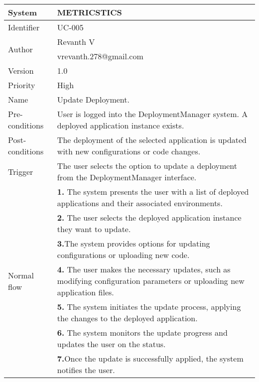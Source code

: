 \begin{table}[htb]
    \centering
    \begin{tabular}{|p{4cm}|p{12cm}|} \hline 
         System &  METRICSTICS\\ \hline 
         
         Identifier & UC-005 \\ \hline 
         
         \multirow{2}{*}{Author} & Revanth V  \\
         &vrevanth.278@gmail.com\\
           \hline 
           Version & 1.0\\ \hline
         
         Priority &  High\\ \hline 
         
         Name &  Update Deployment. \\ \hline 
         Pre-conditions & User is logged into the DeploymentManager system.
A deployed application instance exists. \\ \hline 
         Post-conditions & The deployment of the selected application is updated with new configurations or code changes. \\ \hline
         Trigger & The user selects the option to update a deployment from the DeploymentManager interface.
 \\ \hline
        \multirow{7}{*}{Normal flow} 
        & \textbf{1.}   The system presents the user with a list of deployed applications and their associated environments. \\ 
        & \textbf{2.}  The user selects the deployed application instance they want to update.\\
 & \textbf{3.}The system provides options for updating configurations or uploading new code. \\ 
        & \textbf{4.} The user makes the necessary updates, such as modifying configuration parameters or uploading new application files.\\
 & \textbf{5.}  The system initiates the update process, applying the changes to the deployed application. \\ 
        & \textbf{6.}  The system monitors the update progress and updates the user on the status.\\
 & \textbf{7.}Once the update is successfully applied, the system notifies the user. \\ 
         
         
        

\end{tabular}
\end{table}
